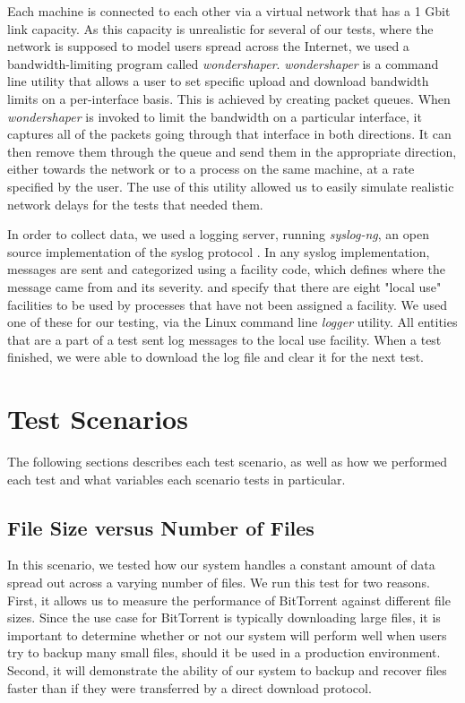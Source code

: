 \documentclass[12pt]{report}
\begin{document}
Each machine is connected to each other via a virtual network that has a 1 Gbit link capacity. As this capacity is unrealistic for several of our tests, where the network is supposed to model users spread across the Internet, we used a bandwidth-limiting program called \textit{wondershaper}. \textit{wondershaper} is a command line utility that allows a user to set specific upload and download bandwidth limits on a per-interface basis. This is achieved by creating packet queues. When \textit{wondershaper} is invoked to limit the bandwidth on a particular interface, it captures all of the packets going through that interface in both directions. It can then remove them through the queue and send them in the appropriate direction, either towards the network or to a process on the same machine, at a rate specified by the user. The use of this utility allowed us to easily simulate realistic network delays for the tests that needed them.

In order to collect data, we used a logging server, running \textit{syslog-ng}, an open source implementation of the syslog protocol \cite{syslogRFC1,syslogRFC2}. In any syslog implementation, messages are sent and categorized using a facility code, which defines where the message came from and its severity. \cite{syslogRFC1} and \cite{syslogRFC2} specify that there are eight "local use" facilities to be used by processes that have not been assigned a facility. We used one of these for our testing, via the Linux command line \textit{logger} utility. All entities that are a part of a test sent log messages to the local use facility. When a test finished, we were able to download the log file and clear it for the next test.

\section{Test Scenarios} \label{sec:TestScenatios_chap:Methodology}

The following sections describes each test scenario, as well as how we performed each test and what variables each scenario tests in particular.

\subsection{File Size versus Number of Files} \label{subsec:FileSizeversusNumberofFiles_sec:TestScenarios_chap:Methodology}

In this scenario, we tested how our system handles a constant amount of data spread out across a varying number of files. We run this test for two reasons. First, it allows us to measure the performance of BitTorrent against different file sizes. Since the use case for BitTorrent is typically downloading large files, it is important to determine whether or not our system will perform well when users try to backup many small files, should it be used in a production environment. Second, it will demonstrate the ability of our system to backup and recover files faster than if they were transferred by a direct download protocol.
\end{document}
